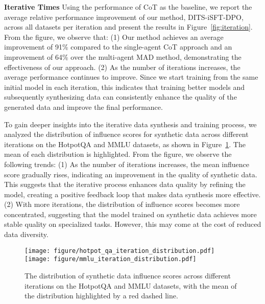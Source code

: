 \textbf{Iterative Times} Using the performance of CoT as the baseline, we report the average relative performance improvement of our method, DITS-iSFT-DPO, across all datasets per iteration and present the results in Figure~\ref{fig:iteration}. From the figure, we observe that: (1) Our method achieves an average improvement of 91\% compared to the single-agent CoT approach and an improvement of 64\% over the multi-agent MAD method, demonstrating the effectiveness of our approach. (2) As the number of iterations increases, the average performance continues to improve. Since we start training from the same initial model in each iteration, this indicates that training better models and subsequently synthesizing data can consistently enhance the quality of the generated data and improve the final performance.


To gain deeper insights into the iterative data synthesis and training process, we analyzed the distribution of influence scores for synthetic data across different iterations on the HotpotQA and MMLU datasets, as shown in Figure~\ref{fig:iteration_distribution}. The mean of each distribution is highlighted. From the figure, we observe the following trends: (1) As the number of iterations increases, the mean influence score gradually rises, indicating an improvement in the quality of synthetic data. This suggests that the iterative process enhances data quality by refining the model, creating a positive feedback loop that makes data synthesis more effective. (2) With more iterations, the distribution of influence scores becomes more concentrated, suggesting that the model trained on synthetic data achieves more stable quality on specialized tasks. However, this may come at the cost of reduced data diversity.

\begin{figure}
    \centering
    \texttt{[image: figure/hotpot\_qa\_iteration\_distribution.pdf]}
    \texttt{[image: figure/mmlu\_iteration\_distribution.pdf]}
    \caption{The distribution of synthetic data influence scores across different iterations on the HotpotQA and MMLU datasets, with the mean of the distribution highlighted by a red dashed line.}
    \label{fig:iteration_distribution}
\end{figure}

